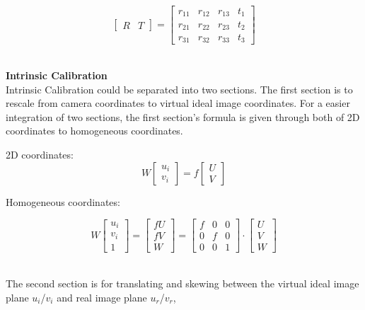 \begin{equation}
%
\left[ \begin{array}{cc} R & T \end{array} \right] %
= %
\begin{bmatrix}
 r_{11} & r_{12} & r_{13} & t_1 \\
 r_{21} & r_{22} & r_{23} & t_2 \\
 r_{31} & r_{32} & r_{33} & t_3
\end{bmatrix}
%
\end{equation}
\\\par
%
%
\textbf{Intrinsic Calibration}\\
Intrinsic Calibration could be separated into two sections. The first section is to rescale from camera coordinates to virtual ideal image coordinates. For a easier integration of two sections, the first section's formula is given through both of 2D coordinates to homogeneous coordinates.\par
%
\quad\quad2D coordinates:%
\begin{equation}
%
W \left[ \begin{array}{c} u_i \\ v_i  \end{array} \right] %
= f %
\left[ \begin{array}{c} U \\ V \end{array} \right]%
%
\end{equation}

\quad\quad Homogeneous coordinates:\par
\begin{equation}
%
W \left[ \begin{array}{c} u_i \\ v_i \\ 1 \end{array} \right] %
= %
\left[ \begin{array}{c} fU \\ fV \\ W \end{array} \right]%
=  \begin{bmatrix} f & 0 & 0 \\ 0 & f & 0 \\ 0 & 0 & 1 \end{bmatrix} \cdot %
\left[ \begin{array}{c} U \\ V \\ W \end{array} \right]%
\label{section_1}
\end{equation}%
\\\par
%
The second section is for translating and skewing between the virtual ideal image plane \(u_i\)/\(v_i\) and real image plane \(u_r\)/\(v_r\),  %

